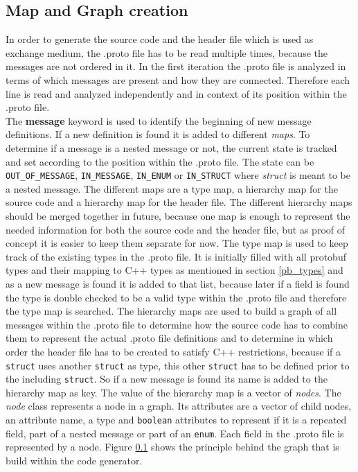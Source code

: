 \subsection{Map and Graph creation}
\label{mfl_generation_graph}
In order to generate the source code and the header file which is used as exchange medium, the .proto file has to be read multiple times, because the messages are not ordered in it. In the first iteration the .proto file is analyzed in terms of which messages are present and how they are connected. Therefore each line is read and analyzed independently and in context of its position within the .proto file.\\
The \textbf{message} keyword is used to identify the beginning of new message definitions. If a new definition is found it is added to different \emph{maps}. To determine if a message is a nested message or not, the current state is tracked and set according to the position within the .proto file. The state can be \verb|OUT_OF_MESSAGE|, \verb|IN_MESSAGE|, \verb|IN_ENUM| or \verb|IN_STRUCT| where \emph{struct} is meant to be a nested message. The different maps are a type map, a hierarchy map for the source code and a hierarchy map for the header file. The different hierarchy maps should be merged together in future, because one map is enough to represent the needed information for both the source code and the header file, but as proof of concept it is easier to keep them separate for now. The type map is used to keep track of the existing types in the .proto file. It is initially filled with all protobuf types and their mapping to C++ types as mentioned in section \ref{pb_types} and as a new message is found it is added to that list, because later if a field is found the type is double checked to be a valid type within the .proto file and therefore the type map is searched. The hierarchy maps are used to build a graph of all messages within the .proto file to determine how the source code has to combine them to represent the actual .proto file definitions and to determine in which order the header file has to be created to satisfy C++ restrictions, because if a \verb|struct| uses another \verb|struct| as type, this other \verb|struct| has to be defined prior to the including \verb|struct|. So if a new message is found its name is added to the hierarchy map as key. The value of the hierarchy map is a vector of \emph{nodes}. The \emph{node} class represents a node in a graph. Its attributes are a vector of child nodes, an attribute name, a type and \verb|boolean| attributes to represent if it is a repeated field, part of a nested message or part of an \verb|enum|. Each field in the .proto file is represented by a node. Figure \ref{mfl_generation_graph} shows the principle behind the graph that is build within the code generator.
